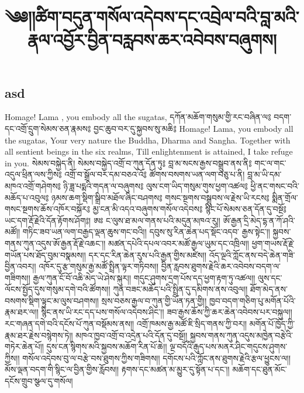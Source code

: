 



\title{\large ༄༅།།ཚིག་བདུན་གསོལ་འདེབས་དང་འབྲེལ་བའི་བླ་མའི་རྣལ་འབྱོར་བྱིན་བརླབས་ཆར་འབེབས་བཞུགས།}

\maketitle
\subsection{asd}

{
  {Homage! {} Lama {}, you embody all the sugatas,}
  དཀོན་མཆོག་གསུམ་གྱི་རང་བཞིན་ལ༔
  བདག་དང་འགྲོ་དྲུག་སེམས་ཅན་རྣམས༔
  བྱང་ཆུབ་བར་དུ་སྐྱབས་སུ་མཆི༔
}
{
  Homage! Lama, you embody all the sugatas,
  Your very nature the Buddha, Dharma and Sangha.
  Together with all sentient beings in the six realms,
  Till enlightenment is attained, I take refuge in you.
}
{སེམས་བསྐྱེད་ནི།}
{
  \Large
  སེམས་བསྐྱེད་འགྲོ་བ་ཀུན་དོན་ཏུ༔
  བླ་མ་སངས་རྒྱས་བསྒྲུབ་ནས་ནི༔
  གང་ལ་གང་འདུལ་ཕྲིན་ལས་ཀྱིས༔
  འགྲོ་བ་སྒྲོལ་བར་དམ་བཅའ་འོ༔
}
{ཚོགས་བསགས་ཡན་ལག་བཅུ་པ་ནི།}
{
  \Large
  བླ་མ་ཡི་དམ་མཁའ་འགྲོ་གཤེགས༔
  ཉི་ཟླ་པདྨའི་གདན་ལ་བཞུགས༔
  ལུས་ངག་ཡིད་གསུམ་གུས་ཕྱག་འཚལ༔
  ཕྱི་ནང་གསང་བའི་མཆོད་པ་འབུལ༔
  ཉམས་ཆག་སྡིག་སྒྲིབ་མཐོལ་ཞིང་བཤགས༔
  གསང་སྔགས་བསྒྲུབས་ལ་རྗེས་ཡི་རངས༔
  སྨིན་གྲོལ་གསང་སྔགས་ཆོས་འཁོར་བསྐོར༔
  མྱ་ངན་མི་འདའ་བཞུགས་གསོལ་འདེབས༔
  སྙིང་པོ་སེམས་ཅན་དོན་དུ་བསྔོ༔
  ཡང་དག་རྡོ་རྗེའི་དོན་རྟོགས་ཤོག༔།
}
{
  \Large
  ཨཿ ང་ལུས་ཐ་མལ་གནས་པའི་མདུན་མཁའ་རུ།།
  ཨོ་རྒྱན་དྲི་མེད་དྷ་ན་ཀོ་ཤའི་མཚོ།།
  གཏིང་ཟབ་ཡན་ལག་བརྒྱད་ལྡན་ཆུས་གང་བའི།།
  དབུས་སུ་རིན་ཆེན་པད་སྡོང་འདབ་ རྒྱས་སྟེང་།།
  སྐྱབས་གནས་ཀུན་འདུས་ཨོ་རྒྱན་རྡོ་རྗེ་འཆང་།།
  མཚན་དཔེའི་དཔལ་འབར་མཚོ་རྒྱལ་ཡུམ་དང་འཁྲིལ།།
  ཕྱག་གཡས་རྡོ་རྗེ་གཡོན་པས་ཐོད་བུམ་བསྣམས།།
  དར་དང་རིན་ཆེན་རུས་པའི་རྒྱན་གྱིས་མཛེས།།
  འོད་ལྔའི་ཀློང་ནས་བདེ་ཆེན་གཟི་བྱིན་འབར།།
  འཁོར་དུ་རྩ་གསུམ་རྒྱ་མཚོ་སྤྲིན་ལྟར་གཏིབས།།
  བྱིན་རླབས་ཐུགས་རྗེའི་ཆར་འབེབས་བདག་ལ་གཟིགས།།
  རྒྱལ་ཀུན་ངོ་བོ་འཆི་མེད་ཡེ་ཤེས་སྐུར།།
  གདུང་ཤུགས་དྲག་པོས་དད་ཕྱག་རྟག་ཏུ་འཚལ།།
  ལུས་དང་ལོངས་སྤྱོད་དུས་གསུམ་དགེ་བའི་ཚོགས།།
  ཀུན་བཟང་མཆོད་པའི་སྤྲིན་དུ་དམིགས་ནས་འབུལ།།
  ཐོག་མེད་ནས་བསགས་སྡིག་ལྟུང་མ་ལུས་བཤགས།།
  སྲས་བཅས་རྒྱལ་བ་ཀུན་གྱི་ཡོན་ཏན་གྱི།།
  ཁྱབ་བདག་གཅིག་པུ་མགོན་པོའི་རྣམ་ཐར་ལ།།
  སྙིང་ནས་ཡི་རང་དད་པས་གསོལ་འདེབས་ཤིང་།།
  ཟབ་རྒྱས་ཆོས་ཀྱི་ཆར་ཆེན་འབེབས་པར་བསྐུལ།།
  རང་གཞན་དགེ་བའི་དངོས་པོ་ཀུན་བསྡོམས་ནས།།
  འགྲོ་ཁམས་རྒྱ་མཚོ་ཇི་སྲིད་གནས་ཀྱི་བར།།
  མགོན་པོ་ཁྱོད་ཀྱི་རྣམ་ཐར་རྗེས་བསྙེགས་ཏེ།།
  མཁའ་ཁྱབ་འགྲོ་བ་འདྲེན་པའི་དོན་དུ་བསྔོ།།
  སྐྱབས་གནས་ཀུན་འདུས་མཁྱེན་བརྩེའི་གཏེར་ཆེན་པོ།།
  དུས་ངན་སྙིགས་མའི་སྐྱབས་མཆོག་རིན་པོ་ཆེ།།
  ལྔ་བདོའི་རྒུད་པས་མནར་ཤིང་གདུངས་ཤུགས་ཀྱིས།།
  གསོལ་འདེབས་བུ་ལ་བརྩེ་བས་ཐུགས་ཀྱིས་གཟིགས།།
  དགོངས་པའི་ཀློང་ནས་ཐུགས་རྗེའི་རྩལ་ཕྱུངས་ལ།།
  མོས་ལྡན་བདག་གི་སྙིང་ལ་བྱིན་གྱིས་རློབས།།
  རྟགས་དང་མཚན་མ་མྱུར་དུ་སྟོན་པ་དང་།།
  མཆོག་དང་ཐུན་མོང་དངོས་གྲུབ་སྩལ་དུ་གསོལ།
}
